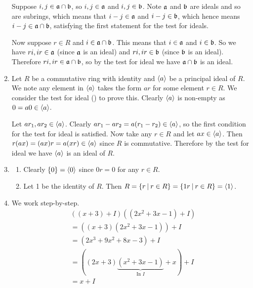 \begin{enumerate}
    Suppose $i,j\in\mathfrak{a}\cap\mathfrak{b}$, so $i,j \in \mathfrak{a}$ and $i,j \in \mathfrak{b}$. Note $\mathfrak{a}$ and $\mathfrak{b}$ are ideals and so are subrings, which means that $i-j \in \mathfrak{a}$ and $i-j \in \mathfrak{b}$, which hence means $i-j \in \mathfrak{a}\cap\mathfrak{b}$, satisfying the first statement for the test for ideals.

    Now suppose $r \in R$ and $i \in \mathfrak{a}\cap\mathfrak{b}$. This means that $i \in \mathfrak{a}$ and $i \in \mathfrak{b}$. So we have $ri, ir \in \mathfrak{a}$ (since $\mathfrak{a}$ is an ideal) and $ri, ir \in \mathfrak{b}$ (since $\mathfrak{b}$ is an ideal). Therefore $ri,ir \in \mathfrak{a}\cap\mathfrak{b}$, so by the test for ideal we have $\mathfrak{a}\cap\mathfrak{b}$ is an ideal.

    \item Let $R$ be a commutative ring with identity and $\left\langle a\right\rangle$ be a principal ideal of $R$. We note any element in $\left\langle a\right\rangle$ takes the form $ar$ for some element $r \in R$. We consider the test for ideal () to prove this. Clearly $\left\langle a\right\rangle$ is non-empty as $0 = a0 \in \left\langle a\right\rangle$.
    
    Let $ar_1, ar_2 \in \left\langle a\right\rangle$. Clearly $ar_1 - ar_2 = a(r_1-r_2) \in \left\langle a\right\rangle$, so the first condition for the test for ideal is satisfied. Now take any $r \in R$ and let $ax \in \left\langle a\right\rangle$. Then $r(ax) = (ax)r = a(xr) \in \left\langle a\right\rangle$ since $R$ is commutative. Therefore by the test for ideal we have $\left\langle a\right\rangle$ is an ideal of $R$.

    \item \begin{enumerate}[label=(\alph*)]
        \item Clearly $\{0\} = \left\langle0\right\rangle$ since $0r = 0$ for any $r \in R$.
        \item Let 1 be the identity of $R$. Then $R = \{r \vert r \in R\} = \{1r \vert r \in R\} = \princ{1}$.
    \end{enumerate}

    \item We work step-by-step.
    \begin{align*}
        &\left((x + 3) + I\right)\left((2x^2 + 3x - 1) + I\right)\\
        &= \left((x + 3)(2x^2+3x-1)\right) + I\\
        &= \left(2x^3 + 9x^2 + 8x - 3\right) + I\\
        &= \left((2x+3)\underbrace{(x^2+3x-1)}_{\text{In }I} + x\right) + I\\
        &= x + I
    \end{align*}


\end{enumerate}
